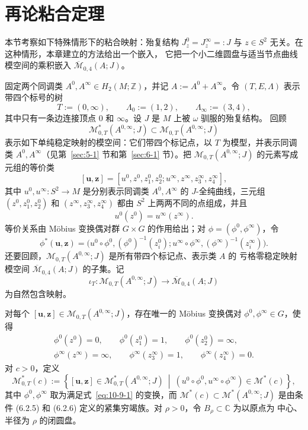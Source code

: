 
\section{再论粘合定理}\label{sec:10-9}

本节考察如下特殊情形下的粘合映射：殆复结构
$J_z^0=J_z^\infty=:J$ 与 $z\in S^2$ 无关。在这种情形，本章建立的方法给出一个嵌入，
它把一个小二维圆盘与适当节点曲线模空间的乘积嵌入
$\overline{\mathcal M}_{0,4}(A;J)$。

固定两个同调类 $A^0,A^\infty\in H_2(M;\mathbb Z)$，并记
$A:=A^0+A^\infty$。令 $(T,E,\Lambda)$ 表示带四个标号的树
\[
  T:=(0,\infty),\qquad \Lambda_0:=(1,2),\qquad \Lambda_\infty:=(3,4),
\]
其中只有一条边连接顶点 $0$ 和 $\infty$。设 $J$ 是 $M$ 上被 $\omega$ 驯服的殆复结构。
回顾
\[
  \mathcal M_{0,T}^*(A^{0,\infty};J)
  \subset\mathcal M_{0,T}(A^{0,\infty};J)
\]
表示如下单纯稳定映射的模空间：它们带四个标记点，以 $T$ 为模型，并表示同调类
$A^0,A^\infty$（见第~\ref{sec:5-1} 节和第~\ref{sec:6-1} 节）。把
$\mathcal M_{0,T}(A^{0,\infty};J)$ 的元素写成元组的等价类
\[
  [\mathbf u,\mathbf z]
  =[u^0,z^0,z_1^0,z_2^0;
    u^\infty,z^\infty,z_3^\infty,z_4^\infty],
\]
其中 $u^0,u^\infty:S^2\to M$ 是分别表示同调类 $A^0,A^\infty$ 的
$J$-全纯曲线，三元组 $(z^0,z_1^0,z_2^0)$ 和
$(z^\infty,z_3^\infty,z_4^\infty)$ 都由 $S^2$ 上两两不同的点组成，并且
\[
  u^0(z^0)=u^\infty(z^\infty).
\]
等价关系由 Möbius 变换偶对群 $G\times G$ 的作用给出；对
$\phi=(\phi^0,\phi^\infty)$，令
\[
  \phi^*(\mathbf u,\mathbf z)
  =\bigl(u^0\circ\phi^0,(\phi^0)^{-1}(z_i^0);
  u^\infty\circ\phi^\infty,(\phi^\infty)^{-1}(z_i^\infty)\bigr).
\]
还要回顾，$\mathcal M_{0,T}(A^{0,\infty};J)$ 是所有带四个标记点、表示类 $A$ 的
亏格零稳定映射模空间 $\overline{\mathcal M}_{0,4}(A;J)$ 的子集。记
\[
  \iota_T:\mathcal M_{0,T}(A^{0,\infty};J)
  \longrightarrow\overline{\mathcal M}_{0,4}(A;J)
\]
为自然包含映射。

对每个 $[\mathbf u,\mathbf z]\in\mathcal M_{0,T}(A^{0,\infty};J)$，存在唯一的
Möbius 变换偶对 $\phi^0,\phi^\infty\in G$，使得
\begin{equation}\label{eq:10-9-1}
\begin{gathered}
  \phi^0(z^0)=0,\qquad \phi^0(z_1^0)=1,\qquad \phi^0(z_2^0)=\infty,\\
  \phi^\infty(z^\infty)=\infty,\qquad
  \phi^\infty(z_3^\infty)=1,\qquad
  \phi^\infty(z_4^\infty)=0.
\end{gathered}
\end{equation}
对 $c>0$，定义
\[
  \mathcal M_{0,T}^*(c):=
  \left\{[\mathbf u,\mathbf z]\in\mathcal M_{0,T}^*(A^{0,\infty};J)
  \ \middle|\
  (u^0\circ\phi^0,u^\infty\circ\phi^\infty)\in\mathcal M^*(c)
  \right\},
\]
其中 $\phi^0,\phi^\infty$ 取为满足式~\eqref{eq:10-9-1} 的变换，而
$\mathcal M^*(c)\subset\mathcal M^*(A^{0,\infty};J)$ 是由条件 (6.2.5) 和
(6.2.6) 定义的紧集穷竭族。对 $\rho>0$，令 $B_\rho\subset\mathbb C$ 为以原点为
中心、半径为 $\rho$ 的闭圆盘。

